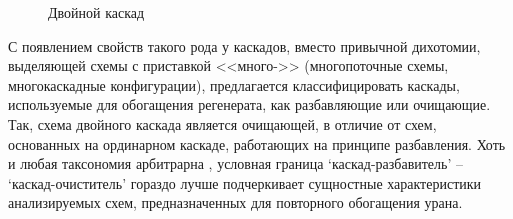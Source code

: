 \begin{figure}[ht]
  \caption{Двойной каскад}\label{fig:double}
\end{figure}

С появлением свойств такого рода у каскадов, вместо привычной дихотомии, выделяющей схемы с приставкой <<много->> (многопоточные схемы, многокаскадные конфигурации), предлагается классифицировать каскады, используемые для обогащения регенерата, как разбавляющие или очищающие. Так, схема двойного каскада является очищающей, в отличие от схем, основанных на ординарном каскаде, работающих на принципе разбавления.  Хоть и любая таксономия арбитрарна
, условная граница `каскад-разбавитель' -- `каскад-очиститель' гораздо лучше подчеркивает сущностные характеристики анализируемых схем, предназначенных для повторного обогащения урана.
 

